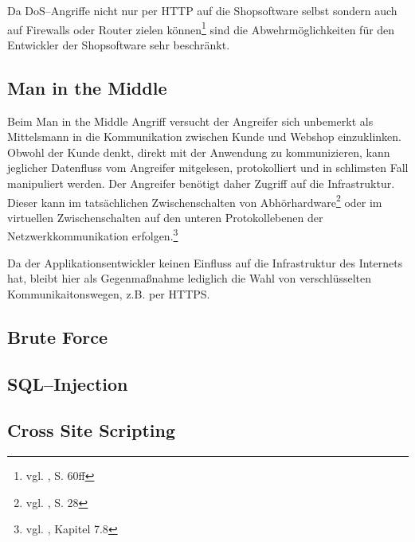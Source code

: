 Da \ac{DoS}--Angriffe nicht nur per \ac{HTTP} auf die Shopsoftware selbst sondern auch auf Firewalls oder Router zielen können\footnote{vgl. \cite{amoroso}, S. 60ff} sind die Abwehrmöglichkeiten für den Entwickler der Shopsoftware sehr beschränkt.

\subsection{Man in the Middle}

Beim Man in the Middle Angriff versucht der Angreifer sich unbemerkt als Mittelsmann in die Kommunikation zwischen Kunde und Webshop einzuklinken. Obwohl der Kunde denkt, direkt mit der Anwendung zu kommunizieren, kann jeglicher Datenfluss vom Angreifer mitgelesen, protokolliert und in schlimsten Fall manipuliert werden. Der Angreifer benötigt daher Zugriff auf die Infrastruktur. Dieser kann im tatsächlichen Zwischenschalten von Abhörhardware\footnote{vgl. \cite{stoll}, S. 28} oder im virtuellen Zwischenschalten auf den unteren Protokollebenen der Netzwerkkommunikation erfolgen.\footnote{vgl. \cite{pritchett}, Kapitel 7.8}

Da der Applikationsentwickler keinen Einfluss auf die Infrastruktur des Internets hat, bleibt hier als Gegenmaßnahme lediglich die Wahl von verschlüsselten Kommunikaitonswegen, z.B. per \ac{HTTPS}.

\subsection{Brute Force}

\subsection{SQL--Injection}

\subsection{Cross Site Scripting}

